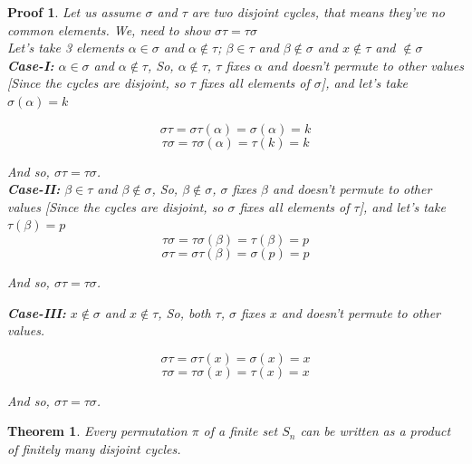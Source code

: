 \documentclass[12pt,a4paper]{article}
\theoremstyle{custom}
\newtheorem*{theorem}{Theorem}
\newtheorem*{proofcustom}{Proof}
\begin{document}
\begin{proofcustom}
    Let us assume $\sigma$ and $\tau$ are two disjoint cycles, that means they've no common elements. 
    We, need to show $\boxed{\sigma\tau = \tau\sigma}$\\
    Let's take 3 elements $\alpha \in \sigma$ and  $\alpha \notin \tau$; $\beta \in \tau$ and  $\beta \notin \sigma$ and $x \notin \tau$ and $\notin \sigma$ \\

    \textbf{Case-I:} \hspace{0.5cm}  $\alpha \in \sigma$ and  $\alpha \notin \tau$, So, $\alpha \notin \tau$, $\tau$ fixes $\alpha$ and doesn't permute to other values [Since the cycles are disjoint, so $\tau$ fixes all elements of $\sigma$], and let's take $\sigma(\alpha) = k$

    $$\sigma\tau=\sigma\tau(\alpha)=\sigma(\alpha)=k$$
    $$\tau\sigma=\tau \sigma(\alpha)=\tau(k)=k
    $$

    And so, $\boxed{\sigma\tau=\tau\sigma}$. \\ 
\textbf{Case-II:}\hspace{0.5cm} $\beta \in \tau$ and  $\beta \notin \sigma$, So, $\beta \notin \sigma$, $\sigma$ fixes $\beta$ and doesn't permute to other values [Since the cycles are disjoint, so $\sigma$ fixes all elements of $\tau$], and let's take $\tau(\beta) = p$
 $$\tau\sigma=\tau \sigma(\beta)=\tau(\beta)=p
    $$
    $$\sigma\tau=\sigma\tau(\beta)=\sigma(p)=p$$
   

    And so, $\boxed{\sigma\tau=\tau\sigma}$. 

   \textbf{Case-III:}\hspace{0.5cm} $x \notin \sigma$ and  $x \notin \tau$, So, both $\tau$, $\sigma$ fixes $x$ and doesn't permute to other values. 
 
    
    $$\sigma\tau=\sigma\tau(x)=\sigma(x)=x$$
   $$\tau\sigma=\tau \sigma(x)=\tau(x)=x$$

    And so, $\boxed{\sigma\tau=\tau\sigma}$.  
    
\end{proofcustom}
\newpage
\begin{theorem}
Every permutation $\pi$ of a finite set $S_n$ can be written as a product of finitely many disjoint cycles.
\end{theorem}
\end{document}
